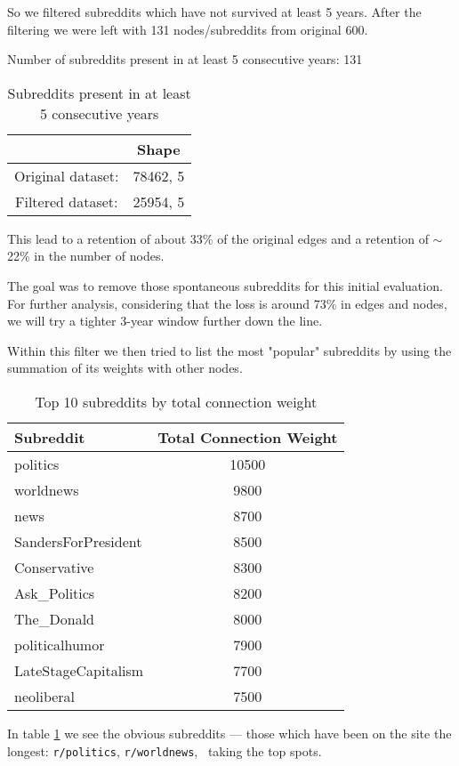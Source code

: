 \documentclass{article}
\theoremstyle{definition}
\begin{document}
So we filtered subreddits which have not survived at least 5 years. After the filtering we were left with 131 nodes/subreddits from original 600.

Number of subreddits present in at least 5 consecutive years: 131

\begin{table}[h]
\centering
\begin{tabular}{cc}
\hline
& Shape\\
\hline
Original dataset: &   78462, 5 \\
Filtered dataset: &   25954, 5 \\
\hline
\end{tabular}
\vspace{10pt}
\caption{Subreddits present in at least 5 consecutive years}
\end{table}%

This lead to a retention of about 33\% of the original edges and a retention of  $\sim$22\% in the number of nodes. 

The goal was to remove those spontaneous subreddits for this initial evaluation. For further analysis, considering that the loss is around 73\% in edges and nodes, we will try a tighter 3-year window further down the line.

Within this filter we then tried to list the most "popular" subreddits by using the summation of its weights with other nodes.

\begin{table}[h]
\centering
\begin{tabular}{lc}
\hline
Subreddit & Total Connection Weight \\
\hline
politics & 10500 \\
worldnews & 9800 \\
news & 8700 \\
SandersForPresident & 8500 \\
Conservative & 8300 \\
Ask\_Politics & 8200 \\
The\_Donald & 8000 \\
politicalhumor & 7900 \\
LateStageCapitalism & 7700 \\
neoliberal & 7500 \\
\hline
\end{tabular}
\vspace{10pt}
\caption{Top 10 subreddits by total connection weight}
\label{tab:top10}
\end{table}%
\newpage
In table \ref{tab:top10} we see the obvious subreddits --- those which have been on the site the longest: \texttt{r/politics}, \texttt{r/worldnews}, \textellipsis\ taking the top spots. 
\end{document}
